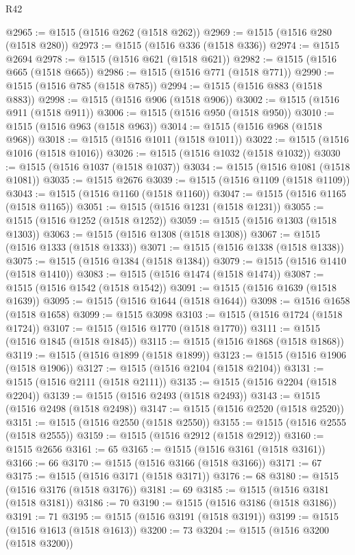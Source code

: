 \begin{lexlean}{R42}
\begin{coremodule}
{@2965 := @1515 (@1516 @262 (@1518 @262))
@2969 := @1515 (@1516 @280 (@1518 @280))
@2973 := @1515 (@1516 @336 (@1518 @336))
@2974 := @1515 @2694
@2978 := @1515 (@1516 @621 (@1518 @621))
@2982 := @1515 (@1516 @665 (@1518 @665))
@2986 := @1515 (@1516 @771 (@1518 @771))
@2990 := @1515 (@1516 @785 (@1518 @785))
@2994 := @1515 (@1516 @883 (@1518 @883))
@2998 := @1515 (@1516 @906 (@1518 @906))
@3002 := @1515 (@1516 @911 (@1518 @911))
@3006 := @1515 (@1516 @950 (@1518 @950))
@3010 := @1515 (@1516 @963 (@1518 @963))
@3014 := @1515 (@1516 @968 (@1518 @968))
@3018 := @1515 (@1516 @1011 (@1518 @1011))
@3022 := @1515 (@1516 @1016 (@1518 @1016))
@3026 := @1515 (@1516 @1032 (@1518 @1032))
@3030 := @1515 (@1516 @1037 (@1518 @1037))
@3034 := @1515 (@1516 @1081 (@1518 @1081))
@3035 := @1515 @2676
@3039 := @1515 (@1516 @1109 (@1518 @1109))
@3043 := @1515 (@1516 @1160 (@1518 @1160))
@3047 := @1515 (@1516 @1165 (@1518 @1165))
@3051 := @1515 (@1516 @1231 (@1518 @1231))
@3055 := @1515 (@1516 @1252 (@1518 @1252))
@3059 := @1515 (@1516 @1303 (@1518 @1303))
@3063 := @1515 (@1516 @1308 (@1518 @1308))
@3067 := @1515 (@1516 @1333 (@1518 @1333))
@3071 := @1515 (@1516 @1338 (@1518 @1338))
@3075 := @1515 (@1516 @1384 (@1518 @1384))
@3079 := @1515 (@1516 @1410 (@1518 @1410))
@3083 := @1515 (@1516 @1474 (@1518 @1474))
@3087 := @1515 (@1516 @1542 (@1518 @1542))
@3091 := @1515 (@1516 @1639 (@1518 @1639))
@3095 := @1515 (@1516 @1644 (@1518 @1644))
@3098 := @1516 @1658 (@1518 @1658)
@3099 := @1515 @3098
@3103 := @1515 (@1516 @1724 (@1518 @1724))
@3107 := @1515 (@1516 @1770 (@1518 @1770))
@3111 := @1515 (@1516 @1845 (@1518 @1845))
@3115 := @1515 (@1516 @1868 (@1518 @1868))
@3119 := @1515 (@1516 @1899 (@1518 @1899))
@3123 := @1515 (@1516 @1906 (@1518 @1906))
@3127 := @1515 (@1516 @2104 (@1518 @2104))
@3131 := @1515 (@1516 @2111 (@1518 @2111))
@3135 := @1515 (@1516 @2204 (@1518 @2204))
@3139 := @1515 (@1516 @2493 (@1518 @2493))
@3143 := @1515 (@1516 @2498 (@1518 @2498))
@3147 := @1515 (@1516 @2520 (@1518 @2520))
@3151 := @1515 (@1516 @2550 (@1518 @2550))
@3155 := @1515 (@1516 @2555 (@1518 @2555))
@3159 := @1515 (@1516 @2912 (@1518 @2912))
@3160 := @1515 @2656
@3161 := 65
@3165 := @1515 (@1516 @3161 (@1518 @3161))
@3166 := 66
@3170 := @1515 (@1516 @3166 (@1518 @3166))
@3171 := 67
@3175 := @1515 (@1516 @3171 (@1518 @3171))
@3176 := 68
@3180 := @1515 (@1516 @3176 (@1518 @3176))
@3181 := 69
@3185 := @1515 (@1516 @3181 (@1518 @3181))
@3186 := 70
@3190 := @1515 (@1516 @3186 (@1518 @3186))
@3191 := 71
@3195 := @1515 (@1516 @3191 (@1518 @3191))
@3199 := @1515 (@1516 @1613 (@1518 @1613))
@3200 := 73
@3204 := @1515 (@1516 @3200 (@1518 @3200))
}
\end{coremodule}
\end{lexlean}

